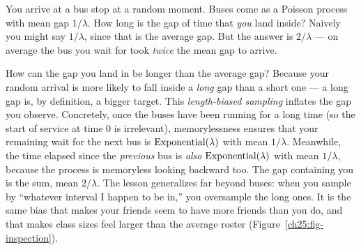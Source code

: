 \begin{paradoxbox}
You arrive at a bus stop at a random moment. Buses come as a Poisson process with
mean gap $1/\lambda$. How long is the gap of time that \emph{you} land inside?
Naively you might say $1/\lambda$, since that is the average gap. But the answer
is $2/\lambda$ --- on average the bus you wait for took \emph{twice} the mean gap
to arrive.

How can the gap you land in be longer than the average gap? Because your random
arrival is more likely to fall inside a \emph{long} gap than a short one --- a
long gap is, by definition, a bigger target. This \emph{length-biased sampling}
inflates the gap you observe. Concretely, once the buses have been running for a
long time (so the start of service at time $0$ is irrelevant), memorylessness
ensures that your remaining wait for the next bus is $\operatorname{Exponential}(\lambda)$ with mean
$1/\lambda$. Meanwhile, the time elapsed since the \emph{previous} bus is
\emph{also} $\operatorname{Exponential}(\lambda)$ with mean $1/\lambda$, because the process is
memoryless looking backward too. The gap containing
you is the sum, mean $2/\lambda$. The lesson generalizes far beyond buses: when
you sample by ``whatever interval I happen to be in,'' you oversample the long
ones. It is the same bias that makes your friends seem to have more friends than
you do, and that makes class sizes feel larger than the average roster
(Figure~\ref{ch25:fig-inspection}).
\end{paradoxbox}

